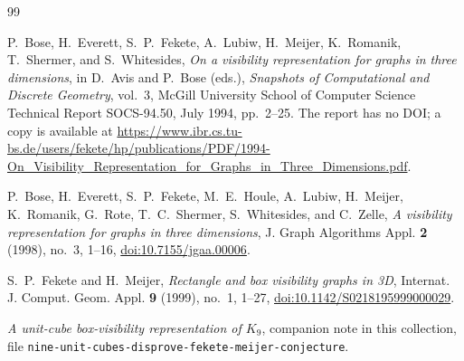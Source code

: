 \documentclass[11pt]{amsart}
\begin{document}
\begin{thebibliography}{99}

P.~Bose, H.~Everett, S.~P.~Fekete, A.~Lubiw, H.~Meijer, K.~Romanik,
T.~Shermer, and S.~Whitesides,
\emph{On a visibility representation for graphs in three dimensions},
in D.~Avis and P.~Bose (eds.),
\emph{Snapshots of Computational and Discrete Geometry}, vol.~3,
McGill University School of Computer Science Technical Report SOCS-94.50,
July 1994, pp.~2--25.  The report has no DOI; a copy is available at
\url{https://www.ibr.cs.tu-bs.de/users/fekete/hp/publications/PDF/1994-On_Visibility_Representation_for_Graphs_in_Three_Dimensions.pdf}.

P.~Bose, H.~Everett, S.~P.~Fekete, M.~E.~Houle, A.~Lubiw, H.~Meijer,
K.~Romanik, G.~Rote, T.~C.~Shermer, S.~Whitesides, and C.~Zelle,
\emph{A visibility representation for graphs in three dimensions},
J. Graph Algorithms Appl. \textbf{2} (1998), no.~3, 1--16,
\href{https://doi.org/10.7155/jgaa.00006}{doi:10.7155/jgaa.00006}.

S.~P.~Fekete and H.~Meijer,
\emph{Rectangle and box visibility graphs in 3D},
Internat. J. Comput. Geom. Appl. \textbf{9} (1999), no.~1, 1--27,
\href{https://doi.org/10.1142/S0218195999000029}
{doi:10.1142/S0218195999000029}.

\emph{A unit-cube box-visibility representation of $K_9$},
companion note in this collection, file
\texttt{nine-unit-cubes-\allowbreak disprove-fekete-meijer-conjecture}.

\end{thebibliography}
\end{document}
